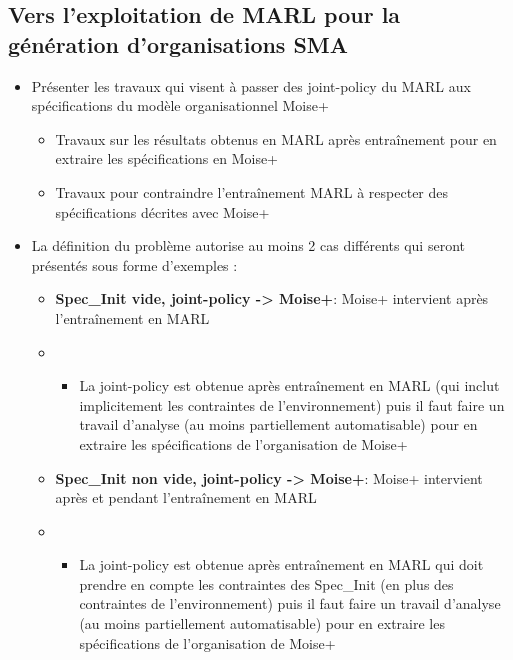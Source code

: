 \subsection{Vers l'exploitation de MARL pour la génération d'organisations SMA}

\begin{itemize}

    \item Présenter les travaux qui visent à passer des joint-policy du MARL aux spécifications du modèle organisationnel Moise+
          \begin{itemize}

              \item Travaux sur les résultats obtenus en MARL après entraînement pour en extraire les spécifications en Moise+
              \item Travaux pour contraindre l'entraînement MARL à respecter des spécifications décrites avec Moise+
          \end{itemize}
    \item La définition du problème autorise au moins 2 cas différents qui seront présentés sous forme d'exemples :
          \begin{itemize}
              \item \textbf{Spec\_Init vide, joint-policy -> Moise+}: Moise+ intervient après l'entraînement en MARL
              \item \begin{itemize}
                        \item La joint-policy est obtenue après entraînement en MARL (qui inclut implicitement les contraintes de l'environnement) puis il faut faire un travail d'analyse (au moins partiellement automatisable) pour en extraire les spécifications de l'organisation de Moise+
                    \end{itemize}
              \item \textbf{Spec\_Init non vide, joint-policy -> Moise+}: Moise+ intervient après et pendant l'entraînement en MARL
              \item \begin{itemize}
                        \item La joint-policy est obtenue après entraînement en MARL qui doit prendre en compte les contraintes des Spec\_Init (en plus des contraintes de l'environnement) puis il faut faire un travail d'analyse (au moins partiellement automatisable) pour en extraire les spécifications de l'organisation de Moise+

\end{itemize}
\end{itemize}
\end{itemize}
